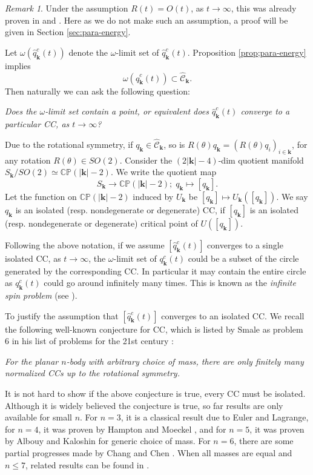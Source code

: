 \documentclass[11pt]{amsart}
\theoremstyle{definition}
\theoremstyle{remark}
\newtheorem{remark}[theorem]{Remark}
\numberwithin{equation}{section}
\newcommand{\cc}{\mathbb C}
\newcommand{\pp}{\mathbb P}
\newcommand{\scc}{\mathscr C}
\newcommand{\tht}{\theta}
\newcommand{\om}{\omega}
\newcommand{\bk}{\mathbf k}
\begin{document}
\begin{remark}
Under the assumption $R(t) = O(t)$, as $t \to \infty$, this was already proven in \cite{Sr71} and \cite{MS76}. Here as we do not make such an assumption, a proof will be given in Section \ref{sec:para-energy}. 
\end{remark}

Let $\om(\hat{q}^c_{\bk}(t))$ denote the $\om$-limit set of $\hat{q}^c_{\bk}(t)$. Proposition \ref{prop;para-energy} implies 
$$ \om(\hat{q}^c_{\bk}(t)) \subset \hat{\scc}_{\bk}.$$
Then naturally we can ask the following question:

\emph{Does the $\om$-limit set contain a point, or equivalent does $\hat{q}^c_{\bk}(t)$ converge to a particular CC, as $t \to \infty$? } 

Due to the rotational symmetry, if $q_{\bk} \in \hat{\mathscr{C}}_{\bk}$, so is $R(\tht) q_{\bk}= (R(\tht) q_i)_{i \in \bk}$, for any rotation $R(\tht) \in SO(2)$. Consider the $(2|\bk|-4)$-dim quotient manifold $S_{\bk}/SO(2) \simeq \cc \mathbb{P}(|\bk|-2)$. We write the quotient map 
$$ S_{\bk} \to  \cc \mathbb{P}(|\bk|-2); \; q_{\bk} \mapsto [q_{\bk}]. $$
Let the function on $\cc \pp (|\bk|- 2)$ induced by $U_{\bk}$ be $[q_{\bk}] \mapsto U_{\bk}([q_{\bk}])$. We say $q_{\bk}$ is an isolated (resp. nondegenerate or degenerate) CC, if $[q_{\bk}]$ is an isolated (resp. nondegenerate or degenerate) critical point of $U([q_{\bk}])$.

Following the above notation, if we assume $[\hat{q}^c_{\bk}(t)]$ converges to a single isolated CC, as $t \to \infty$, the $\om$-limit set of $q^c_{\bk}(t)$ could be a subset of the circle generated by the corresponding CC. In particular it may contain the entire circle as $q^c_{\bk}(t)$ could go around infinitely many times. This is known as the \emph{infinite spin problem} (see \cite{Wt41}). 

To justify the assumption that $[\hat{q}^c_{\bk}(t)]$ converges to an isolated CC. We recall the following well-known conjecture for CC, which is listed by Smale \cite{Sm98} as problem 6 in his list of problems for the 21st century : 

\emph{For the planar $n$-body with arbitrary choice of mass, there are only finitely many normalized CCs up to the rotational symmetry.}

It is not hard to show if the above conjecture is true, every CC must be isolated. Although it is widely believed the conjecture is true, so far results are only available for small $n$. For $n=3$, it is a classical result due to Euler and Lagrange, for $n=4$, it was proven by Hampton and Moeckel \cite{HM06}, and for $n=5$, it was proven by Albouy and Kaloshin \cite{AK12} for generic choice of mass. For $n=6$, there are some partial progresses made by Chang and Chen \cite{CC24}. When all masses are equal and $n \le 7$, related results can be found in \cite{MZ19}. 
\end{document}
